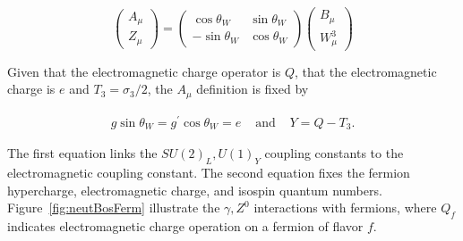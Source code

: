 \begin{equation}
\begin{pmatrix}
A_\mu \\
Z_\mu 
\end{pmatrix}
= \begin{pmatrix}
\cos\theta_W & \sin\theta_W \\
-\sin\theta_W & \cos\theta_W
\end{pmatrix}
\begin{pmatrix}
B_\mu \\
W_\mu^3
\end{pmatrix}
\end{equation}  

Given that the electromagnetic charge operator is $Q$, that the electromagnetic charge is $e$ and $T_3 = \sigma_3/2$, the 
$A_\mu$ definition is fixed by 

\begin{equation}
\begin{aligned}
g\sin\theta_W = g^{'}\cos\theta_W = e  & \text{ and }  & Y = Q - T_3. 
\end{aligned}
\end{equation}

The first equation links the $SU(2)_L,U(1)_Y$ coupling constants to the electromagnetic coupling constant. 
The second equation fixes the fermion hypercharge, electromagnetic charge, and isospin quantum numbers. 
%
%
Figure~\ref{fig:neutBosFerm} illustrate the $\gamma, Z^0$ interactions with fermions, 
where $Q_f$ indicates electromagnetic charge operation on a fermion of flavor $f$.

